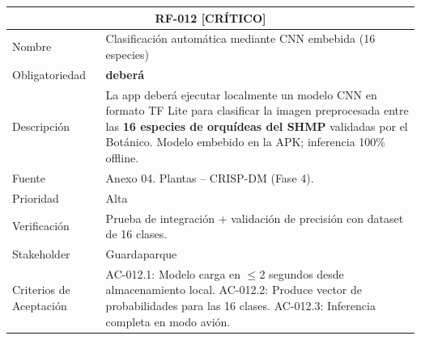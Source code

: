 \documentclass[12pt, a4paper]{article}
\newcommand{\criticomark}{\textcolor{criticolor}{\textbf{[CR\'ITICO]}}}
\begin{document}
\begin{longtable}{|p{3cm}|p{11.5cm}|}
\hline
\multicolumn{2}{|c|}{\textbf{RF-012} \criticomark} \\
\hline
Nombre & Clasificaci\'on autom\'atica mediante CNN embebida (16 especies) \\
\hline
Obligatoriedad & \textbf{deber\'a} \\
\hline
Descripci\'on & La app deber\'a ejecutar localmente un modelo CNN en formato TF Lite para clasificar la imagen preprocesada entre las \textbf{16 especies de orqu\'ideas del SHMP} validadas por el Bot\'anico. Modelo embebido en la APK; inferencia 100\% offline. \\
\hline
Fuente & Anexo 04. Plantas -- CRISP-DM (Fase 4). \\
\hline
Prioridad & Alta \\
\hline
Verificaci\'on & Prueba de integraci\'on + validaci\'on de precisi\'on con dataset de 16 clases. \\
\hline
Stakeholder & Guardaparque \\
\hline
Criterios de Aceptaci\'on &
AC-012.1: Modelo carga en $\leq$2 segundos desde almacenamiento local. \newline
AC-012.2: Produce vector de probabilidades para las 16 clases. \newline
AC-012.3: Inferencia completa en modo avi\'on. \\
\hline
\end{longtable}
\end{document}

